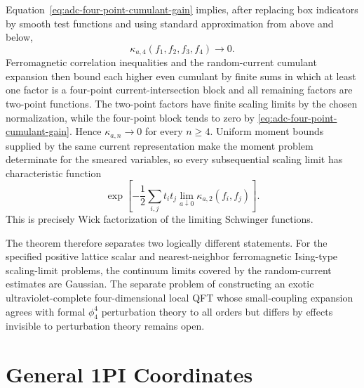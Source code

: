 Equation~\eqref{eq:adc-four-point-cumulant-gain} implies, after replacing
box indicators by smooth test functions and using standard approximation
from above and below,
\[
  \kappa_{a,4}(f_1,f_2,f_3,f_4)\longrightarrow0 .
\]
Ferromagnetic correlation inequalities and the random-current cumulant
expansion then bound each higher even cumulant by finite sums in which at
least one factor is a four-point current-intersection block and all remaining
factors are two-point functions.  The two-point factors have finite scaling
limits by the chosen normalization, while the four-point block tends to zero
by \eqref{eq:adc-four-point-cumulant-gain}.  Hence
\(\kappa_{a,n}\to0\) for every \(n\ge4\).  Uniform moment bounds supplied by
the same current representation make the moment problem determinate for the
smeared variables, so every subsequential scaling limit has characteristic
function
\[
  \exp\!\left[
    -\frac12
    \sum_{i,j}t_i t_j
    \lim_{a\downarrow0}\kappa_{a,2}(f_i,f_j)
  \right].
\]
This is precisely Wick factorization of the limiting Schwinger functions.

The theorem therefore separates two logically different statements.  For the
specified positive lattice scalar and nearest-neighbor ferromagnetic
Ising-type scaling-limit problems, the continuum limits covered by the
random-current estimates are Gaussian.  The separate problem of constructing
an exotic ultraviolet-complete four-dimensional local QFT whose
small-coupling expansion agrees with formal \(\phi^4_4\) perturbation theory
to all orders but differs by effects invisible to perturbation theory remains
open.

\section{General 1PI Coordinates}

